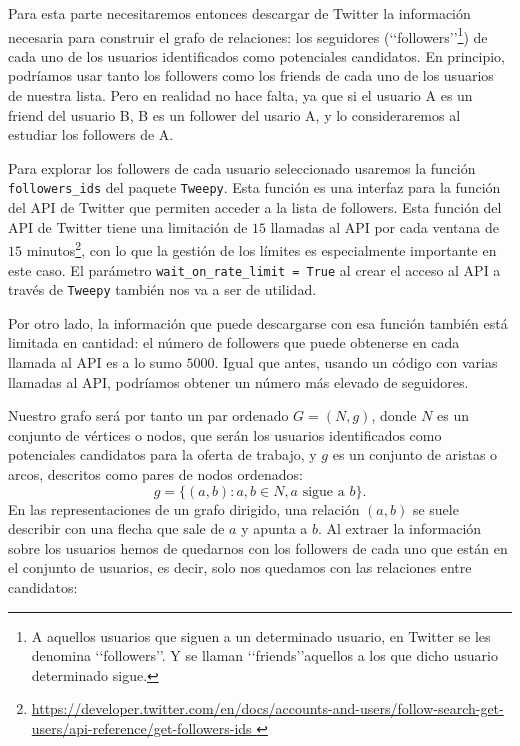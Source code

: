 Para esta parte necesitaremos entonces descargar de Twitter la información
necesaria para construir el grafo de relaciones: los seguidores 
(\lq\lq followers\rq\rq\footnote{A aquellos usuarios que siguen a un determinado usuario, 
en Twitter se les denomina \lq\lq followers\rq\rq. Y se llaman \lq\lq friends\rq\rq aquellos
a los que dicho usuario determinado sigue.})
de cada uno de los usuarios identificados como potenciales candidatos. 
En principio, podríamos usar tanto los followers como los friends de cada uno 
de los usuarios de nuestra lista. Pero en realidad no hace falta, ya que si el usuario
A es un friend del usuario B, B es un follower del usario A, y lo consideraremos al
estudiar los followers de A. 

Para explorar los followers de cada usuario seleccionado usaremos la función 
{\tt followers\_ids} del paquete {\tt Tweepy}. Esta función es una interfaz
para la función del API de Twitter que permiten acceder a la lista de 
followers. Esta función del API de Twitter
tiene una limitación de $15$ llamadas al API por cada ventana de $15$ 
minutos\footnote{\url{https://developer.twitter.com/en/docs/accounts-and-users/follow-search-get-users/api-reference/get-followers-ids }},
con lo que la gestión de los límites es especialmente importante en este caso.
El parámetro {\tt wait\_on\_rate\_limit = True} al crear el acceso al API a 
través de {\tt Tweepy} también nos va a ser de utilidad.

Por otro lado, la información que puede descargarse con esa función también
está limitada en cantidad: el número de followers que puede obtenerse en cada llamada 
al API es a lo sumo $5000$. Igual que antes,
usando un código con varias llamadas al API, podríamos obtener un número más elevado de 
seguidores.

Nuestro grafo será por tanto un par ordenado 
$G=(N,g)$, donde $N$ es un conjunto de vértices o nodos, que serán los usuarios
identificados como potenciales candidatos para la oferta de trabajo, y $g$
es un conjunto de aristas o arcos, descritos como pares de nodos ordenados:
$$g=\{(a,b): a,b\in N, a \mbox{ sigue a }b\}.$$
En las representaciones de un grafo dirigido, una relación $(a,b)$ se 
suele describir con una flecha que sale de $a$ y apunta a $b$.
Al extraer la información sobre los usuarios hemos de quedarnos con los followers
de cada uno que están en el conjunto de usuarios, es decir, solo nos quedamos con
las relaciones entre candidatos:


